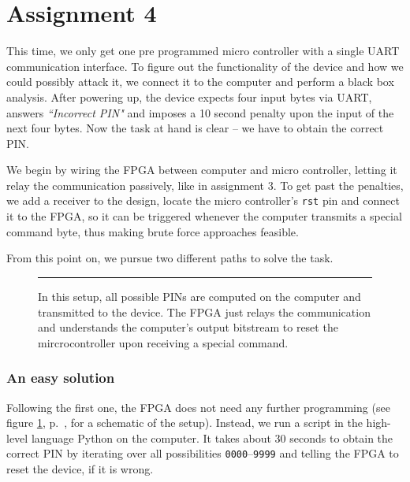 \section*{Assignment 4}


This time, we only get one pre programmed micro controller with a single UART communication interface. 
To figure out the functionality of the device and how we could possibly attack it, we connect it to the computer and perform a black box analysis.
After powering up, the device expects four input bytes via UART, answers \textit{``Incorrect PIN"} and imposes a 10 second penalty upon the input of the next four bytes. Now the task at hand is clear -- we have to obtain the correct PIN.

We begin by wiring the FPGA between computer and micro controller, letting it relay the communication passively, like in assignment 3.
To get past the penalties, we add a receiver to the design, locate the micro controller's \texttt{rst} pin and connect it to the FPGA, so it can be triggered whenever the computer transmits a special command byte, thus making brute force approaches feasible.

From this point on, we pursue two different paths to solve the task.

\begin{figure}[b!]
    \begin{center}
        \hrule\vspace{1em}
        
        \caption{In this setup, all possible PINs are computed on the computer and transmitted to the device. The FPGA just relays the communication and understands the computer's output bitstream to reset the mircrocontroller upon receiving a special command.}
        \label{fig:as4-schematic-1}
    \end{center}
\end{figure}

\subsubsection*{An easy solution}
Following the first one, the FPGA does not need any further programming (see figure \ref{fig:as4-schematic-1}, p.~\pageref{fig:as4-schematic-1}, for a schematic of the setup). Instead, we run a script in the high-level language Python on the computer. It takes about 30 seconds to obtain the correct PIN by iterating over all possibilities \texttt{0000}--\texttt{9999} and telling the FPGA to reset the device, if it is wrong.

